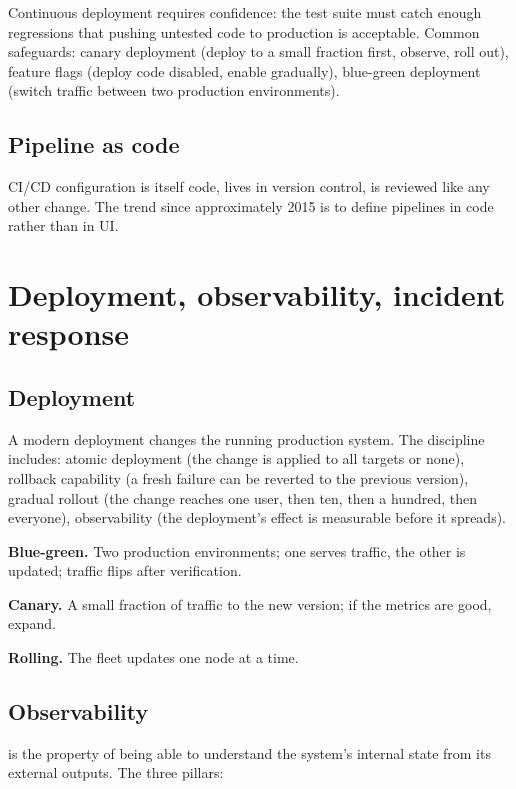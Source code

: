 Continuous deployment requires confidence: the test suite must catch enough regressions that pushing untested code to production is acceptable. Common safeguards: canary deployment (deploy to a small fraction first, observe, roll out), feature flags (deploy code disabled, enable gradually), blue-green deployment (switch traffic between two production environments).

\subsection{Pipeline as code}

CI/CD configuration is itself code, lives in version control, is reviewed like any other change. The trend since approximately 2015 is to define pipelines in code rather than in UI.

\section{Deployment, observability, incident response}

\subsection{Deployment}

A modern deployment changes the running production system. The discipline includes: atomic deployment (the change is applied to all targets or none), rollback capability (a fresh failure can be reverted to the previous version), gradual rollout (the change reaches one user, then ten, then a hundred, then everyone), observability (the deployment's effect is measurable before it spreads).

\textbf{Blue-green.} Two production environments; one serves traffic, the other is updated; traffic flips after verification.

\textbf{Canary.} A small fraction of traffic to the new version; if the metrics are good, expand.

\textbf{Rolling.} The fleet updates one node at a time.

\subsection{Observability}

 is the property of being able to understand the system's internal state from its external outputs. The three pillars:

